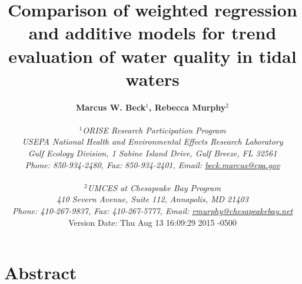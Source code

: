 \documentclass[letterpaper,12pt,oneside]{article}\usepackage[]{graphicx}\usepackage[]{color}
\begin{document}
\raggedbottom
\raggedright
{}
\setlength{\parindent}{0.5in}
\renewcommand\refname{References \vspace{12pt}}

\begin{singlespace}
\title{{\bf {\Large Comparison of weighted regression and additive models for trend evaluation of water quality in tidal waters}}}
\author{
  {\bf {\normalsize Marcus W. Beck$^1$, Rebecca Murphy$^2$}}
  \\\\{\textit {\normalsize $^1$ORISE Research Participation Program}}
  \\{\textit {\normalsize USEPA National Health and Environmental Effects Research Laboratory}}
  \\{\textit {\normalsize Gulf Ecology Division, 1 Sabine Island Drive, Gulf Breeze, FL 32561}}
	\\{\textit {\normalsize Phone: 850-934-2480, Fax: 850-934-2401, Email: \href{mailto:beck.marcus@epa.gov}{beck.marcus@epa.gov}}}
  \\\\{\textit {\normalsize $^2$UMCES at Chesapeake Bay Program}}
	\\{\textit {\normalsize 410 Severn Avenue, Suite 112, Annapolis, MD 21403}}
	\\{\textit {\normalsize Phone: 410-267-9837, Fax: 410-267-5777, Email: \href{mailto:rmurphy@chesapeakbay.net}{rmurphy@chesapeakebay.net}}}
  \vspace{1in} 
  \\ Version Date:   Thu Aug 13 16:09:29 2015 -0500
	}
\date{}
\maketitle
\end{singlespace}
\clearpage

\section*{Abstract}
\end{document}
